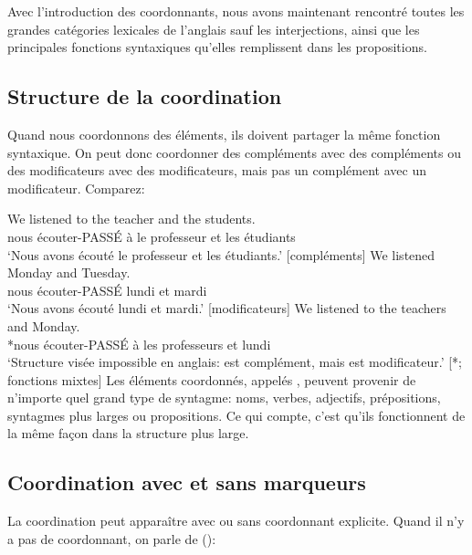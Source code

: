 Avec l'introduction des coordonnants, nous avons maintenant rencontré toutes les grandes catégories lexicales de l'anglais sauf les interjections, ainsi que les principales fonctions syntaxiques qu'elles remplissent dans les propositions.

\subsection{Structure de la coordination}

Quand nous coordonnons des éléments, ils doivent partager la même fonction syntaxique. On peut donc coordonner des compléments avec des compléments ou des modificateurs avec des modificateurs, mais pas un complément avec un modificateur. Comparez:

\ea \label{ex:coord-function-fr}
    \ea \gll We listened {\ob}to the teacher{\cb} {\ob}and the students{\cb}.\\
        nous écouter-PASSÉ à le professeur et les étudiants\\
    \glt `Nous avons écouté le professeur et les étudiants.' [compléments]
    \ex \gll We listened {\ob}Monday{\cb} and {\ob}Tuesday{\cb}.\\
        nous écouter-PASSÉ lundi et mardi\\
    \glt `Nous avons écouté lundi et mardi.' [modificateurs]
    \ex \gll *We listened {\ob}to the teachers{\cb} and {\ob}Monday{\cb}.\\
        *nous écouter-PASSÉ à les professeurs et lundi\\
    \glt `Structure visée impossible en anglais:  est complément, mais  est modificateur.' [*; fonctions mixtes]
    \z
\z
Les éléments coordonnés, appelés , peuvent provenir de n'importe quel grand type de syntagme: noms, verbes, adjectifs, prépositions, syntagmes plus larges ou propositions. Ce qui compte, c'est qu'ils fonctionnent de la même façon dans la structure plus large.

\subsection{Coordination avec et sans marqueurs}

La coordination peut apparaître avec ou sans coordonnant explicite. Quand il n'y a pas de coordonnant, on parle de  ():

